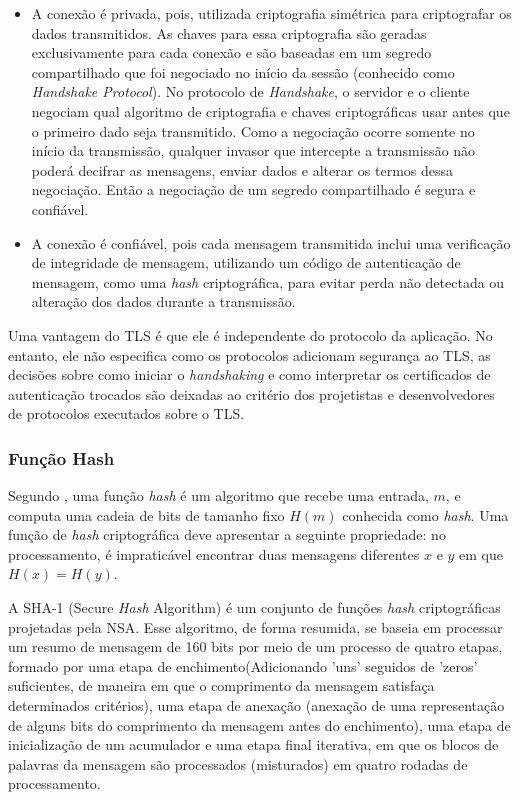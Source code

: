 \begin{itemize}
    \item A conexão é privada, pois, utilizada criptografia simétrica para criptografar os dados transmitidos. As chaves para essa criptografia são geradas exclusivamente para cada conexão e são baseadas em um segredo compartilhado que foi negociado no início da sessão (conhecido como \textit{Handshake Protocol}). No protocolo de \textit{Handshake}, o servidor e o cliente negociam qual algoritmo de criptografia e chaves criptográficas usar antes que o primeiro dado seja transmitido. Como a negociação ocorre somente no início da transmissão, qualquer invasor que intercepte a transmissão não poderá decifrar as mensagens, enviar dados e alterar os termos dessa negociação. Então a negociação de um segredo compartilhado é segura  e confiável.
    \item A conexão é confiável, pois cada mensagem transmitida inclui uma verificação de integridade de mensagem, utilizando um código de autenticação de mensagem, como uma \textit{hash} criptográfica, para evitar perda não detectada ou alteração dos dados durante a transmissão.
\end{itemize}

Uma vantagem do TLS é que ele é independente do protocolo da aplicação. No entanto, ele não especifica como os protocolos adicionam segurança ao TLS, as decisões sobre como iniciar o \textit{handshaking} e como interpretar os certificados de autenticação trocados são deixadas ao critério dos projetistas e desenvolvedores de protocolos executados sobre o TLS.

\subsubsection{Função Hash}

Segundo , uma função \textit{hash} é um algoritmo que recebe uma entrada, $m$, e computa uma cadeia de bits de tamanho fixo $H(m)$ conhecida como \textit{hash}. Uma função de \textit{hash} criptográfica deve apresentar a seguinte propriedade:
no processamento, é impraticável encontrar duas mensagens diferentes $x$ e $y$ em que $H(x)=H(y)$.

A SHA-1 (Secure \textit{Hash} Algorithm) é um conjunto de funções \textit{hash} criptográficas projetadas pela NSA\cite{NSA}. Esse algoritmo, de forma resumida, se baseia em processar um resumo de mensagem de 160 bits por meio de um processo de quatro etapas, formado por uma etapa de enchimento(Adicionando 'uns' seguidos de 'zeros' suficientes, de maneira em que o comprimento da mensagem satisfaça determinados critérios), uma etapa de anexação (anexação de uma representação de alguns bits do comprimento da mensagem antes do enchimento), uma etapa de inicialização de um acumulador e uma etapa final iterativa, em que os blocos de palavras da mensagem são processados (misturados) em quatro rodadas de processamento. 

